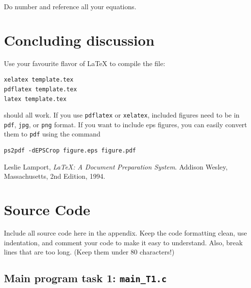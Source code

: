 Do number and reference all your equations.

\section*{Concluding discussion}

Use your favourite flavor of \LaTeX{} to compile the file:
\begin{verbatim}
xelatex template.tex
pdflatex template.tex
latex template.tex
\end{verbatim}
should all work.
If you use \verb+pdflatex+ or \verb+xelatex+, included figures need to be in
\verb+pdf+, \verb+jpg+, or \verb+png+ format. If you want to include eps
figures, you can easily convert them to \verb+pdf+ using the command
\begin{verbatim}
ps2pdf -dEPSCrop figure.eps figure.pdf
\end{verbatim}

\begin{thebibliography}{69}
 Leslie Lamport, \emph{\LaTeX: A Document Preparation
System}. Addison Wesley, Massachusetts, 2nd Edition, 1994.
\end{thebibliography}

\newpage

\appendix

\section{Source Code}

Include all source code here in the appendix. Keep the code formatting clean,
use indentation, and comment your code to make it easy to understand. Also,
break lines that are too long. (Keep them under 80 characters!)

%

%

\subsection{Main program task 1: \texttt{main\_T1.c}}



